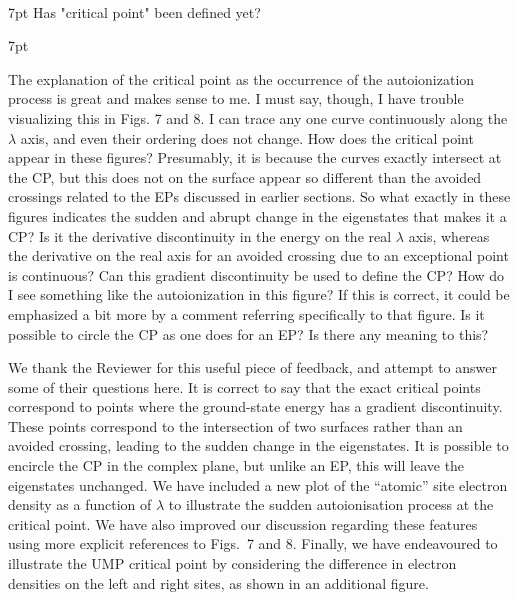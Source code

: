 \documentclass[10pt]{letter}
\newenvironment{formal}{%
  \def\FrameCommand{%
    \hspace{1pt}%
    {\color{darkblue}\vrule width 2pt}%
    {\color{formalshade}\vrule width 4pt}%
    \colorbox{formalshade}%
  }%
  \MakeFramed{\advance\hsize-\width\FrameRestore}%
  \noindent\hspace{-4.55pt}%
  \begin{adjustwidth}{}{7pt}%
  \vspace{2pt}\vspace{2pt}%
}
{%
  \vspace{2pt}\end{adjustwidth}\endMakeFramed%
}
\begin{document}
\begin{letter}
\
\begin{formal}%
Has "critical point" been defined yet?
\end{formal}

\begin{formal}
The explanation of the critical point as the occurrence of the autoionization process is great and makes sense to me. 
I must say, though, I have trouble visualizing this in Figs. 7 and 8. 
I can trace any one curve continuously along the $\lambda$ axis, and even their ordering does not change. 
How does the critical point appear in these figures? 
Presumably, it is because the curves exactly intersect at the CP, but this does not on the surface appear so different than the avoided crossings related to the EPs discussed in earlier sections.
So what exactly in these figures indicates the sudden and abrupt change in the eigenstates that makes it a CP? 
Is it the derivative discontinuity in the energy on the real $\lambda$ axis, whereas the derivative on the real axis for an avoided crossing due to an exceptional point is continuous? 
Can this gradient discontinuity be used to define the CP? 
How do I see something like the autoionization in this figure? 
If this is correct, it could be emphasized a bit more by a comment referring specifically to that figure.
Is it possible to circle the CP as one does for an EP? 
Is there any meaning to this?
\end{formal}

\noindent
We thank the Reviewer for this useful piece of feedback, and attempt to answer some of their questions here.
It is correct to say that the exact critical points correspond to points where the ground-state
energy has a gradient discontinuity. 
These points correspond to the intersection of two surfaces rather than an avoided crossing,
leading to the sudden change in the eigenstates.
It is possible to encircle the CP in the complex plane, but unlike an EP, this will leave the eigenstates unchanged.
We have included a new plot of the ``atomic'' site  electron density as a function of $\lambda$ to illustrate
the sudden autoionisation process at the critical point.
We have also improved our discussion regarding these features using more explicit references to Figs.~7 and 8.
Finally, we have endeavoured to illustrate the UMP critical point by considering the difference in electron densities on the left and right sites, as shown in an additional figure. 


\end{letter}
\end{document}
